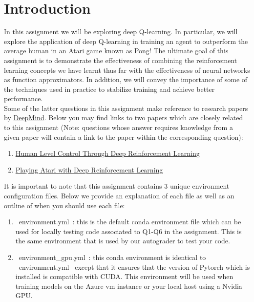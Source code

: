 \section{Introduction}\label{intro}

In this assignment we will be exploring deep Q-learning. In particular, we will explore the application of deep Q-learning in training an agent to outperform the average human in an Atari game known as Pong! The ultimate goal of this assignment is to demonstrate the effectiveness of combining the reinforcement learning concepts we have learnt thus far with the effectiveness of neural networks as function approximators. In addition, we will convey the importance of some of the techniques used in practice to stabilize training and achieve better performance. \\

Some of the latter questions in this assignment make reference to research papers by \href{https://deepmind.com/}{DeepMind}. Below you may find links to two papers which are closely related to this assignment (Note: questions whose answer requires knowledge from a given paper will contain a link to  the paper within the corresponding question):
\begin{enumerate}
  \item \href{https://storage.googleapis.com/deepmind-media/dqn/DQNNaturePaper.pdf}{Human Level Control Through Deep Reinforcement Learning}
  \item \href{https://arxiv.org/pdf/1312.5602v1.pdf}{Playing Atari with Deep Reinforcement Learning}
\end{enumerate}

  It is important to note that this assignment contains 3 unique environment configuration files. Below we provide an explanation of each file as well as an outline of when you should use each file:

  \begin{enumerate}
    \item ~environment.yml~: this is the default conda environment file which can be used for locally testing code associated to Q1-Q6 in the assignment. This is the same environment that is used by our autograder to test your code.

    \item ~environment_gpu.yml~: this conda environment is identical to ~environment.yml~ except that it ensures that the version of Pytorch which is installed is compatible with CUDA. This environment will be used when training models on the Azure vm instance or your local host using a Nvidia GPU.
  \end{enumerate}



